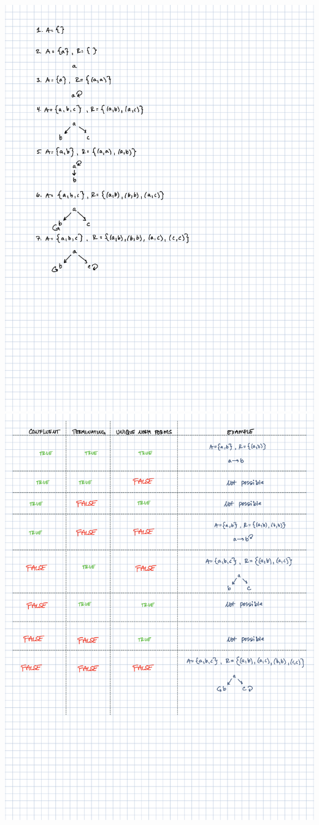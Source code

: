 \documentclass{article}
\theoremstyle{theorem}
\theoremstyle{definition}
\theoremstyle{remark}
\begin{document}
\begin{center}
  \includegraphics[scale=.75]{CPSC354 HW11-1.png}\\
  \includegraphics[scale=.75]{CPSC354 HW11-2.png}

\end{center}
\end{document}
